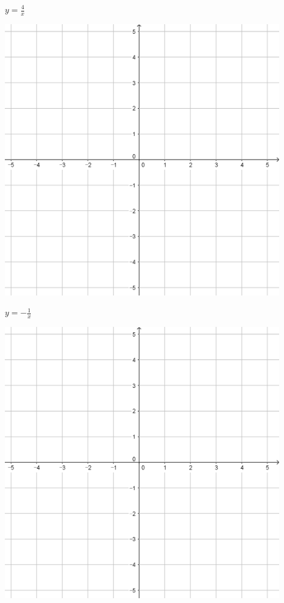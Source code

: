 \documentclass{oblivoir}
\begin{document}
\begin{minipage}{0.45\textwidth}\centering
\(y=\frac4x\)
\par\bigskip\includegraphics[width=0.9\textwidth]{55}
\end{minipage}
\begin{minipage}{0.45\textwidth}\centering
\(y=-\frac1{x}\)
\par\bigskip\includegraphics[width=0.9\textwidth]{55}
\end{minipage}\bigskip\bigskip\par
\end{document}
